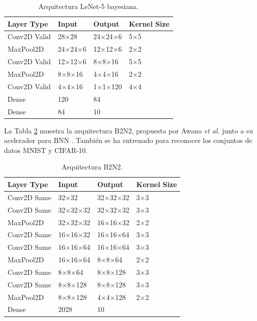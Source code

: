 \begin{table}[h]
    \centering
    \caption{Arquitectura LeNet-5 bayesiana.}
    \label{tab:cnn_models}
    \begin{tabular}{llll}
        \hline
         \textbf{Layer Type} &  \textbf{Input} &  \textbf{Output} & \textbf{Kernel Size} \\ \hline
         Conv2D Valid & 28$\times$28 & 24$\times$24$\times$6 & 5$\times$5 \\
         MaxPool2D & 24$\times$24$\times$6 & 12$\times$12$\times$6 & 2$\times$2 \\
         Conv2D Valid & 12$\times$12$\times$6 & 8$\times$8$\times$16 & 5$\times$5 \\
         MaxPool2D & 8$\times$8$\times$16 & 4$\times$4$\times$16 & 2$\times$2 \\
         Conv2D Valid & 4$\times$4$\times$16 & 1$\times$1$\times$120 & 4$\times$4 \\
         Dense & 120 & 84 & \\
         Dense & 84 & 10 & \\ \hline
    \end{tabular}
\end{table}

La Tabla \ref{tab:b2n2_model} muestra la arquitectura B2N2, propuesta por Awano \emph{et al.} junto a su acelerador para BNN \cite{bnn_clt_approx}. También se ha entrenado para reconocer los conjuntos de datos MNIST y CIFAR-10.

\begin{table}[h]
    \centering
    \caption{Arquitectura B2N2.}
    \label{tab:b2n2_model}
    \begin{tabular}{llll}
    \hline
    \textbf{Layer Type} & \textbf{Input} & \textbf{Output} & \textbf{Kernel Size}\\ \hline
    Conv2D Same & 32$\times$32 & 32$\times$32$\times$32 & 3$\times$3 \\
    Conv2D Same & 32$\times$32$\times$32 & 32$\times$32$\times$32 & 3$\times$3 \\
    MaxPool2D & 32$\times$32$\times$32 & 16$\times$16$\times$32 & 2$\times$2 \\
    Conv2D Same & 16$\times$16$\times$32 & 16$\times$16$\times$64 & 3$\times$3 \\
    Conv2D Same & 16$\times$16$\times$64 & 16$\times$16$\times$64 & 3$\times$3 \\
    MaxPool2D & 16$\times$16$\times$64 & 8$\times$8$\times$64 & 2$\times$2 \\
    Conv2D Same & 8$\times$8$\times$64 & 8$\times$8$\times$128 & 3$\times$3 \\
    Conv2D Same & 8$\times$8$\times$128 & 8$\times$8$\times$128 & 3$\times$3 \\
    MaxPool2D & 8$\times$8$\times$128 & 4$\times$4$\times$128 & 2$\times$2 \\
    Dense & 2028 & 10 & \\ \hline
    \end{tabular}
\end{table}

